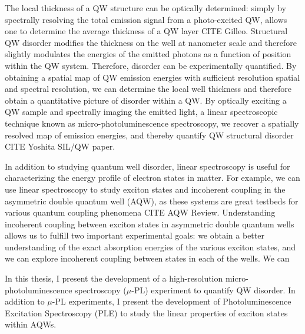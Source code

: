 \indent The local thickness of a QW structure can be optically determined: simply by spectrally resolving the total emission signal from a photo-excited QW, allows one to determine the average thickness of a QW layer CITE Gilleo. Structural QW disorder modifies the thickness on the well at nanometer scale and therefore slightly modulates the energies of the emitted photons as a function of position within the QW system. Therefore, disorder can be experimentally quantified. By obtaining a spatial map of QW emission energies with sufficient resolution spatial and spectral resolution, we can determine the local well thickness and therefore obtain a quantitative picture of disorder within a QW. By optically exciting a QW sample and spectrally imaging the emitted light, a linear spectroscopic technique known as micro-photoluminescence spectroscopy, we recover a spatially resolved map of emission energies, and thereby quantify QW structural disorder CITE Yoshita SIL/QW paper.

\indent In addition to studying quantum well disorder, linear spectroscopy is useful for characterizing the energy profile of electron states in matter. For example, we can use linear spectroscopy to study exciton states and incoherent coupling in the asymmetric double quantum well (AQW), as these systems are great testbeds for various quantum coupling phenomena CITE AQW Review. Understanding incoherent coupling between exciton states in asymmetric double quantum wells allows us to fulfill two important experimental goals: we obtain a better understanding of the exact absorption energies of the various exciton states, and we can explore incoherent coupling between states in each of the wells. We can 

\indent In this thesis, I present the development of a high-resolution micro-photoluminescence spectroscopy ($\mu$-PL) experiment to quantify QW disorder. In addition to $\mu$-PL experiments, I present the development of Photoluminescence Excitation Spectroscopy (PLE) to study the linear properties of exciton states within AQWs.